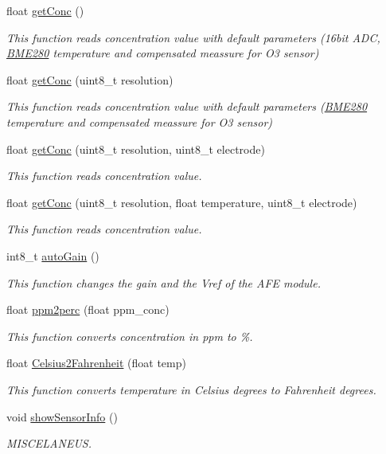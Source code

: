\begin{DoxyCompactItemize}
float \hyperlink{class_gas_a0fda80d31528babdbb6ec2bd563fc436}{get\+Conc} ()
\begin{DoxyCompactList}\small\item\em This function reads concentration value with default parameters (16bit A\+DC, \hyperlink{class_b_m_e280}{B\+M\+E280} temperature and compensated meassure for O3 sensor) \end{DoxyCompactList}\item 
float \hyperlink{class_gas_a91686da9586bc41f99a13bd91a0ed77d}{get\+Conc} (uint8\+\_\+t resolution)
\begin{DoxyCompactList}\small\item\em This function reads concentration value with default parameters (\hyperlink{class_b_m_e280}{B\+M\+E280} temperature and compensated meassure for O3 sensor) \end{DoxyCompactList}\item 
float \hyperlink{class_gas_a732fd18c42ad4c0f0b03ffca9af46aa7}{get\+Conc} (uint8\+\_\+t resolution, uint8\+\_\+t electrode)
\begin{DoxyCompactList}\small\item\em This function reads concentration value. \end{DoxyCompactList}\item 
float \hyperlink{class_gas_a98ccd0b466a4017be356b4c716c340a3}{get\+Conc} (uint8\+\_\+t resolution, float temperature, uint8\+\_\+t electrode)
\begin{DoxyCompactList}\small\item\em This function reads concentration value. \end{DoxyCompactList}\item 
int8\+\_\+t \hyperlink{class_gas_a490e06949bd69d39652033e228487c2a}{auto\+Gain} ()
\begin{DoxyCompactList}\small\item\em This function changes the gain and the Vref of the A\+FE module. \end{DoxyCompactList}\item 
float \hyperlink{class_gas_abdf5e9ce7bb1eb355bc1d649dcdb76f5}{ppm2perc} (float ppm\+\_\+conc)
\begin{DoxyCompactList}\small\item\em This function converts concentration in ppm to \%. \end{DoxyCompactList}\item 
float \hyperlink{class_gas_a0f538f5249e0df773eb642323896ff69}{Celsius2\+Fahrenheit} (float temp)
\begin{DoxyCompactList}\small\item\em This function converts temperature in Celsius degrees to Fahrenheit degrees. \end{DoxyCompactList}\item 
void \hyperlink{class_gas_aa453bad7933117048997ca9c14c47d54}{show\+Sensor\+Info} ()
\begin{DoxyCompactList}\small\item\em M\+I\+S\+C\+E\+L\+A\+N\+E\+US. \end{DoxyCompactList}\end{DoxyCompactItemize}
